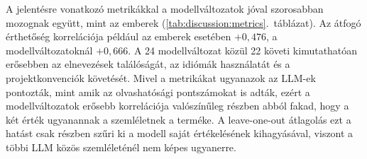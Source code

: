 \documentclass[
]{elteikthesis}[2024/04/26]
\begin{document}
A jelentésre vonatkozó metrikákkal a modellváltozatok jóval szorosabban mozognak együtt,
mint az emberek (\ref{tab:discussion:metrics}.~táblázat).
Az átfogó érthetőség korrelációja például az emberek esetében $+0{,}476$, a modellváltozatoknál $+0{,}666$.
A 24 modellváltozat közül 22 követi kimutathatóan erősebben az elnevezések találóságát,
az idiómák használatát és a projektkonvenciók követését.
Mivel a metrikákat ugyanazok az LLM-ek pontozták,
mint amik az olvashatósági pontszámokat is adták,
ezért a modellváltozatok erősebb korrelációja valószínűleg részben abból fakad,
hogy a két érték ugyanannak a szemléletnek a terméke.
A leave-one-out átlagolás ezt a hatást csak részben szűri ki a modell saját értékelésének kihagyásával,
viszont a többi LLM közös szemléleténél nem képes ugyanerre.

\end{document}

